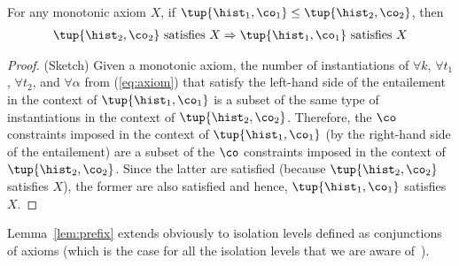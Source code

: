 \begin{lemma}\label{lem:prefix}
For any monotonic axiom $X$, if $\tup{\hist_1,\co_1}\leq \tup{\hist_2,\co_2}$, then
\begin{align*}
\tup{\hist_2,\co_2}\mbox{ satisfies } X \Rightarrow \tup{\hist_1,\co_1}\mbox{ satisfies } X
\end{align*}
\end{lemma}
\begin{proof}(Sketch)
Given a monotonic axiom, the number of instantiations of $\forall k$, $\forall t_1$, $\forall t_2$, and $\forall \alpha$ from (\ref{eq:axiom}) that satisfy the left-hand side of the entailement in the context of $\tup{\hist_1,\co_1}$ is a subset of the same type of instantiations in the context of $\tup{\hist_2,\co_2}$. Therefore, the $\co$ constraints imposed in the context of $\tup{\hist_1,\co_1}$ (by the right-hand side of the entailement) are a subset of the $\co$ constraints imposed in the context of $\tup{\hist_2,\co_2}$. Since the latter are satisfied (because $\tup{\hist_2,\co_2}$  satisfies  $X$), the former are also satisfied and hence, $\tup{\hist_1,\co_1}$  satisfies  $X$.
\end{proof}

Lemma~\ref{lem:prefix} extends obviously to isolation levels defined as conjunctions of axioms (which is the case for all the isolation levels that we are aware of~\cite{DBLP:journals/pacmpl/BiswasE19}).

